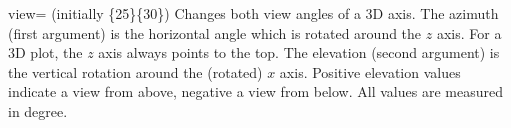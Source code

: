 \begin{pgfplotskey}{view= (initially \{25\}\{30\})}
	Changes both view angles of a 3D axis. The azimuth (first argument) is the horizontal angle which is rotated around the $z$ axis. For a 3D plot, the $z$ axis always points to the top. The elevation (second argument) is the vertical rotation around the (rotated) $x$ axis. Positive elevation values indicate a view from above, negative a view from below. All values are measured in degree.

\pgfplotsexpensiveexample
\begin{codeexample}[]
\end{codeexample}

\pgfplotsexpensiveexample
\begin{codeexample}[]
\end{codeexample}

\pgfplotsexpensiveexample
\begin{codeexample}[]
\end{codeexample}
\end{pgfplotskey}

